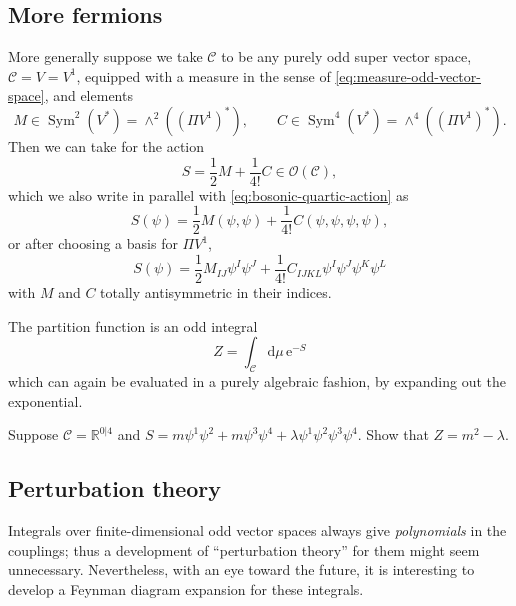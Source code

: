 \documentclass[12pt,letterpaper,reqno]{article}
\numberwithin{equation}{section}
\newcommand{\cC}{\ensuremath{\mathcal C}}
\newcommand{\cO}{\ensuremath{\mathcal O}}
\newcommand{\R}{\ensuremath{\mathbb R}}
\newcommand{\half}{\ensuremath{\frac{1}{2}}}
\newcommand{\e}{{\mathrm e}}
\newcommand{\de}{\mathrm{d}}
\newcommand{\ti}[1]{\textit{#1}}
\DeclareMathOperator{\Sym}{Sym}
\begin{document}
\subsection{More fermions}

More generally suppose we take $\cC$ to be any 
purely odd super vector space, $\cC = V = V^1$,
equipped with a measure in the sense of \eqref{eq:measure-odd-vector-space},
and elements
\begin{equation}
 M \in \Sym^2(V^*) = \wedge^2((\Pi V^1)^*), \qquad C \in \Sym^4(V^*) = \wedge^4((\Pi V^1)^*).
\end{equation}
Then we can take for the action
\begin{equation}
 S = \half M + \frac{1}{4!} C \in \cO(\cC),
\end{equation}
which we also write in parallel with \eqref{eq:bosonic-quartic-action} as
\begin{equation}
  S(\psi) = \half M(\psi,\psi) + \frac{1}{4!} C(\psi, \psi, \psi, \psi),
\end{equation}
or after choosing a basis for $\Pi V^1$,
\begin{equation}
  S(\psi) = \half M_{IJ} \psi^I \psi^J + \frac{1}{4!} C_{IJKL} \psi^I \psi^J \psi^K \psi^L
\end{equation}
with $M$ and $C$ totally antisymmetric in their indices.

The partition function is an odd integral
\begin{equation}
  Z = \int_\cC \de \mu \, \e^{-S}
\end{equation}
which can again be evaluated in a purely algebraic fashion, by expanding
out the exponential.
\begin{exercise}
Suppose $\cC = \R^{0 \vert 4}$
and $S = m \psi^1 \psi^2 + m \psi^3 \psi^4 + \lambda \psi^1 \psi^2 \psi^3 \psi^4$. Show that $Z = m^2 - \lambda$.
\end{exercise}


\subsection{Perturbation theory}

Integrals over finite-dimensional 
odd vector spaces always give \ti{polynomials} in the couplings; 
thus a development of
``perturbation theory'' for them might seem unnecessary.
Nevertheless, with an eye toward the future, it is interesting to
develop a Feynman diagram expansion for these integrals.
\end{document}
